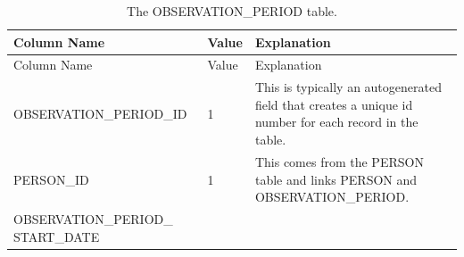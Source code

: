 \documentclass[]{book}
\begin{document}
\begin{longtable}[]{@{}lll@{}}
\caption{\label{tab:observationPeriod} The OBSERVATION\_PERIOD
table.}\tabularnewline
\toprule
\begin{minipage}[b]{0.33\columnwidth}\raggedright\strut
Column Name\strut
\end{minipage} & \begin{minipage}[b]{0.16\columnwidth}\raggedright\strut
Value\strut
\end{minipage} & \begin{minipage}[b]{0.42\columnwidth}\raggedright\strut
Explanation\strut
\end{minipage}\tabularnewline
\midrule
\endfirsthead
\toprule
\begin{minipage}[b]{0.33\columnwidth}\raggedright\strut
Column Name\strut
\end{minipage} & \begin{minipage}[b]{0.16\columnwidth}\raggedright\strut
Value\strut
\end{minipage} & \begin{minipage}[b]{0.42\columnwidth}\raggedright\strut
Explanation\strut
\end{minipage}\tabularnewline
\midrule
\endhead
\begin{minipage}[t]{0.33\columnwidth}\raggedright\strut
OBSERVATION\_PERIOD\_ID\strut
\end{minipage} & \begin{minipage}[t]{0.16\columnwidth}\raggedright\strut
1\strut
\end{minipage} & \begin{minipage}[t]{0.42\columnwidth}\raggedright\strut
This is typically an autogenerated field that creates a unique id number
for each record in the table.\strut
\end{minipage}\tabularnewline
\begin{minipage}[t]{0.33\columnwidth}\raggedright\strut
PERSON\_ID\strut
\end{minipage} & \begin{minipage}[t]{0.16\columnwidth}\raggedright\strut
1\strut
\end{minipage} & \begin{minipage}[t]{0.42\columnwidth}\raggedright\strut
This comes from the PERSON table and links PERSON and
OBSERVATION\_PERIOD.\strut
\end{minipage}\tabularnewline
\begin{minipage}[t]{0.33\columnwidth}\raggedright\strut
OBSERVATION\_PERIOD\_ START\_DATE\strut
\end{minipage} & \begin{minipage}[t]{0.16\columnwidth}\raggedright\strut

\end{minipage}
\end{longtable}
\end{document}
